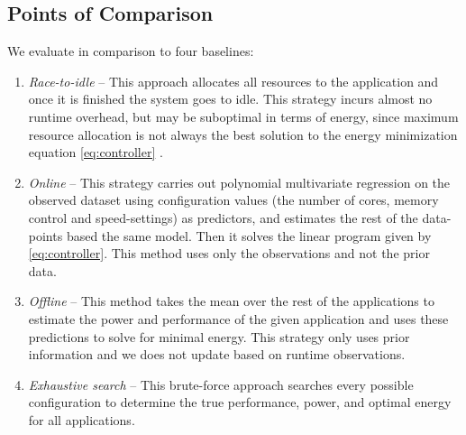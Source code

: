 \subsection{Points of Comparison}
\label{sec:poc}
We evaluate \SYSTEMLEO{} in comparison to four baselines:
\begin{enumerate}
\item \textit{Race-to-idle} -- This approach allocates all resources
  to the application and once it is finished the system goes to idle.
  This strategy incurs almost no runtime overhead, but may be
  suboptimal in terms of energy, since maximum resource allocation is
  not always the best solution to the energy minimization equation
  \eqref{eq:controller}
  \cite{Carroll2013,HotPower,LeSueur11}.
\item \textit{Online} -- This strategy carries out polynomial
  multivariate regression on the observed dataset using configuration
  values (the number of cores, memory control and speed-settings) as
  predictors, and estimates the rest of the data-points based the same
  model. Then it solves the linear program given by
  \eqref{eq:controller}. This method uses only the observations and
  not the prior data.
\item \textit{Offline} -- This method takes the mean over the rest of
  the applications to estimate the power and performance of the given
  application and uses these predictions to solve for minimal energy.
  This strategy only uses prior information and we does not update
  based on runtime observations.
\item \textit{Exhaustive search} -- This brute-force approach searches
  every possible configuration to determine the true performance,
  power, and optimal energy for all applications.
\end{enumerate}

